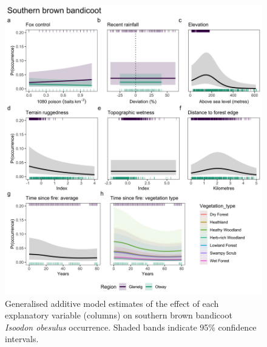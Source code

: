 \documentclass[11pt,a4paper,titlepage,twoside,openright]{style/unimelbthesis}
\begin{document}
\begin{mainmatter}
\begin{figure}
{\centering \includegraphics[width=1\linewidth]{figure/gams_sbb} 

}

\caption{Generalised additive model estimates of the effect of each explanatory variable (columns) on southern brown bandicoot \textit{Isoodon obesulus} occurrence. Shaded bands indicate 95\% confidence intervals.}\label{fig:gams-occ-sbb}
\end{figure}
\newpage
\begin{figure}


\end{figure}
\end{mainmatter}
\end{document}
